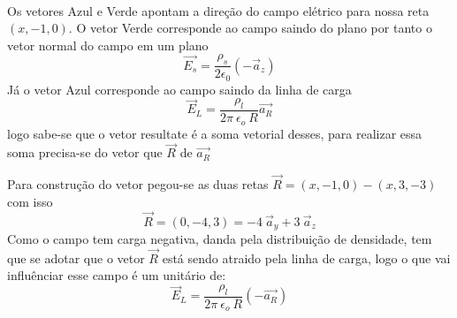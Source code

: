 \documentclass[11pt]{article}
\newcommand{\prompt}[4]{
        {\ttfamily\llap{{\color{#2}[#3]:\hspace{3pt}#4}}\vspace{-\baselineskip}}
    }
\begin{document}
            
\prompt{Out}{outcolor}{31}{}
    
    \begin{center}
    \end{center}
    { \hspace*{\fill} \\}
    

    Os vetores Azul e Verde apontam a direção do campo elétrico para nossa
reta \((x,-1,0)\). O vetor Verde corresponde ao campo saindo do plano
por tanto o vetor normal do campo em um plano
\[ \vec{E_s} = \frac{\rho_s}{2\epsilon_0} (-\vec{a}_z) \] Já o vetor
Azul corresponde ao campo saindo da linha de carga
\[ \vec{E}_L = \frac{\rho_l}{2 \pi \ \epsilon_o \ R} \vec{a_R} \] logo
sabe-se que o vetor resultate é a soma vetorial desses, para realizar
essa soma precisa-se do vetor que \(\vec{R}\) de \(\vec{a_R}\)

    Para construção do vetor pegou-se as duas retas
\(\vec{R} = (x,-1,0) - (x,3,-3)\) com isso
\[\vec{R} = (0,-4,3) = -4 \ \vec{a}_y + 3\ \vec{a}_z\] Como o campo tem
carga negativa, danda pela distribuição de densidade, tem que se adotar
que o vetor \(\vec{R}\) está sendo atraido pela linha de carga, logo o
que vai influênciar esse campo é um unitário de:
\[ \vec{E}_L = \frac{\rho_l}{2 \pi \ \epsilon_o \ R} (-\vec{a_R}) \]
\end{document}
